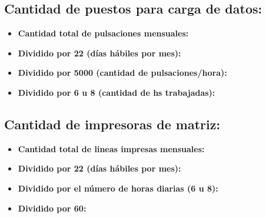 \subsection{Cantidad de puestos para carga de datos:}
\begin{itemize}
  \item \textbf{Cantidad total de pulsaciones mensuales:}
  \item \textbf{Dividido por 22 (días hábiles por mes):}
  \item \textbf{Dividido por 5000 (cantidad de pulsaciones/hora):}
  \item \textbf{Dividido por 6 u 8 (cantidad de hs trabajadas):}
\end{itemize}

\subsection{Cantidad de impresoras de matriz:}
\begin{itemize}
  \item \textbf{Cantidad total de lineas impresas mensuales:}
  \item \textbf{Dividido por 22 (días hábiles por mes):}
  \item \textbf{Dividido por el número de horas diarias (6 u 8):}
  \item \textbf{Dividido por 60:}
\end{itemize}

